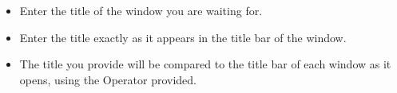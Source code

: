 \begin{itemize}
\item Enter the title of the window you are waiting for. 
\item Enter the title exactly as it appears in the title bar of the window.
\item The title you provide will be compared to the title bar of each window as it opens, using the Operator provided.
\end{itemize}

